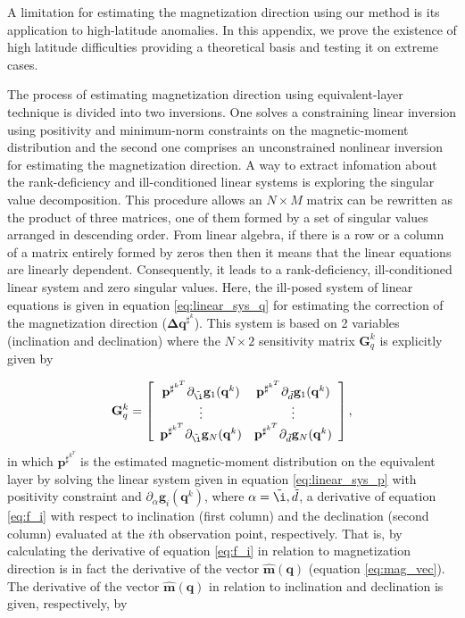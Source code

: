 
A limitation for estimating the magnetization direction using our method is its application to high-latitude anomalies. In this appendix, we prove the existence of high latitude difficulties providing a theoretical basis and testing it on extreme cases.

The process of estimating magnetization direction using equivalent-layer technique is divided into two inversions. One solves a constraining linear inversion using positivity and minimum-norm constraints on the magnetic-moment distribution and the second one comprises an unconstrained nonlinear inversion for estimating the magnetization direction. A way to extract infomation about the rank-deficiency and ill-conditioned linear systems is exploring the singular value decomposition. This procedure allows an $N \times M$ matrix can be rewritten as the product of three matrices, one of them formed by a set of singular values arranged in descending order. From linear algebra, if there is a row or a column of a matrix entirely formed by zeros then then it means that the linear equations are linearly dependent. Consequently, it leads to a rank-deficiency, ill-conditioned linear system and zero singular values. Here, the ill-posed system of linear equations is given in equation \ref{eq:linear_sys_q} for estimating the correction of the magnetization direction ($\mathbf{\Delta q}^{\sharp^k}$). This system is based on 2 variables (inclination and declination) where the $N \times 2$ sensitivity matrix $\mathbf{G}_{q}^{k}$ is explicitly given by

\begin{equation}
\mathbf{G}_{q}^{k} =
\left[ \begin{array}{cc}
\mathbf{p}^{\sharp^{k^T}} \partial_{\tilde{\i}} \mathbf{g}_{1} (\mathbf{q}^k) & \mathbf{p}^{\sharp^{k^T}} \partial_{\tilde{d}} \mathbf{g}_{1}(\mathbf{q}^k) \\
\vdots & \vdots  \\
\mathbf{p}^{\sharp^{k^T}} \partial_{\tilde{\i}} \mathbf{g}_{N} (\mathbf{q}^k) & \mathbf{p}^{\sharp^{k^T}} \partial_{\tilde{d}} \mathbf{g}_{N} (\mathbf{q}^k)
\end{array} \right] ,
\label{eq:gp}
\end{equation}
in which $\mathbf{p}^{\sharp^{k^T}}$ is the estimated magnetic-moment distribution on the equivalent layer by solving the linear system given in equation \ref{eq:linear_sys_p} with positivity constraint and $\partial_{\alpha}\mathbf{g}_{i} (\mathbf{q}^k)$, where $\alpha= \tilde{\i}, \tilde{d}$, a derivative of equation \ref{eq:f_i} with respect to inclination (first column) and the declination (second column) evaluated at the $i$th observation point, respectively. That is, by calculating the derivative of equation \ref{eq:f_i} in relation to magnetization direction is in fact the derivative of the vector $\hat{\mathbf{m}}(\mathbf{q})$ (equation \ref{eq:mag_vec}). The derivative of the vector $\hat{\mathbf{m}}(\mathbf{q})$ in relation to inclination and declination is given, respectively, by 


